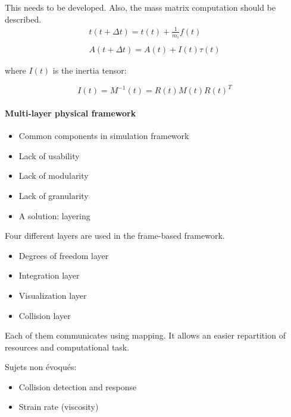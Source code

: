 This needs to be developed.
Also, the mass matrix computation should be described.
\begin{equation}
\begin{array}{l}
t(t+\Delta t) = t(t) + \frac{1}{m_{i}}f(t) \\ \\
A(t+\Delta t) = A(t) + I(t)\tau(t)
\end{array}
\end{equation}

where $I(t)$ is the inertia tensor:

\begin{equation}
I(t) = M^{-1}(t) = R(t)M(t)R(t)^{T} 
\end{equation}

\paragraph{Multi-layer physical framework}

\begin{itemize}
\item Common components in simulation framework
\item Lack of usability
\item Lack of modularity
\item Lack of granularity
\item A solution: layering
\end{itemize}

Four different layers are used in the frame-based framework.
\begin{itemize}
\item Degrees of freedom layer
\item Integration layer
\item Visualization layer
\item Collision layer
\end{itemize}

Each of them communicates using mapping.
It allows an easier repartition of resources and computational task.

Sujets non évoqués:
\begin{itemize}
\item Collision detection and response
\item Strain rate (viscosity)
\end{itemize}

